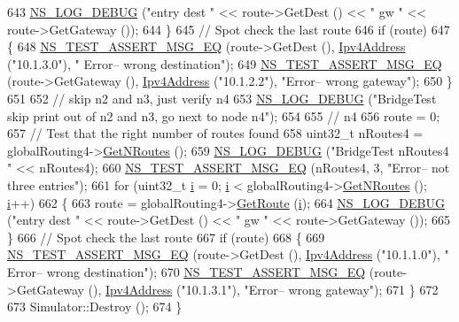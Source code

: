 \begin{DoxyCode}
643       \hyperlink{group__logging_ga413f1886406d49f59a6a0a89b77b4d0a}{NS\_LOG\_DEBUG} (\textcolor{stringliteral}{"entry dest "} << route->GetDest () << \textcolor{stringliteral}{" gw "} << route->GetGateway ());
644     \}
645   \textcolor{comment}{// Spot check the last route}
646   \textcolor{keywordflow}{if} (route)
647     \{
648       \hyperlink{group__testing_ga2a9d78cffb3db8e867c35fff0b698cf5}{NS\_TEST\_ASSERT\_MSG\_EQ} (route->GetDest (), \hyperlink{classns3_1_1Ipv4Address}{Ipv4Address} (\textcolor{stringliteral}{"10.1.3.0"}), \textcolor{stringliteral}{"
      Error-- wrong destination"});
649       \hyperlink{group__testing_ga2a9d78cffb3db8e867c35fff0b698cf5}{NS\_TEST\_ASSERT\_MSG\_EQ} (route->GetGateway (), 
      \hyperlink{classns3_1_1Ipv4Address}{Ipv4Address} (\textcolor{stringliteral}{"10.1.2.2"}), \textcolor{stringliteral}{"Error-- wrong gateway"});
650     \}
651 
652   \textcolor{comment}{// skip n2 and n3, just verify n4}
653   \hyperlink{group__logging_ga413f1886406d49f59a6a0a89b77b4d0a}{NS\_LOG\_DEBUG} (\textcolor{stringliteral}{"BridgeTest skip print out of n2 and n3, go next to node n4"});
654 
655   \textcolor{comment}{// n4}
656   route = 0;
657   \textcolor{comment}{// Test that the right number of routes found}
658   uint32\_t nRoutes4 = globalRouting4->\hyperlink{classns3_1_1Ipv4GlobalRouting_abb9d2b3642272b9bd2697a5699922fa7}{GetNRoutes} ();
659   \hyperlink{group__logging_ga413f1886406d49f59a6a0a89b77b4d0a}{NS\_LOG\_DEBUG} (\textcolor{stringliteral}{"BridgeTest nRoutes4 "} << nRoutes4);
660   \hyperlink{group__testing_ga2a9d78cffb3db8e867c35fff0b698cf5}{NS\_TEST\_ASSERT\_MSG\_EQ} (nRoutes4, 3, \textcolor{stringliteral}{"Error-- not three entries"});
661   \textcolor{keywordflow}{for} (uint32\_t \hyperlink{bernuolliDistribution_8m_a6f6ccfcf58b31cb6412107d9d5281426}{i} = 0; \hyperlink{bernuolliDistribution_8m_a6f6ccfcf58b31cb6412107d9d5281426}{i} < globalRouting4->\hyperlink{classns3_1_1Ipv4GlobalRouting_abb9d2b3642272b9bd2697a5699922fa7}{GetNRoutes} (); \hyperlink{bernuolliDistribution_8m_a6f6ccfcf58b31cb6412107d9d5281426}{i}++)
662     \{
663       route = globalRouting4->\hyperlink{classns3_1_1Ipv4GlobalRouting_accd518b9888908dbea189c1d1c73dcf1}{GetRoute} (\hyperlink{bernuolliDistribution_8m_a6f6ccfcf58b31cb6412107d9d5281426}{i});
664       \hyperlink{group__logging_ga413f1886406d49f59a6a0a89b77b4d0a}{NS\_LOG\_DEBUG} (\textcolor{stringliteral}{"entry dest "} << route->GetDest () << \textcolor{stringliteral}{" gw "} << route->GetGateway ());
665     \}
666   \textcolor{comment}{// Spot check the last route}
667   \textcolor{keywordflow}{if} (route)
668     \{
669       \hyperlink{group__testing_ga2a9d78cffb3db8e867c35fff0b698cf5}{NS\_TEST\_ASSERT\_MSG\_EQ} (route->GetDest (), \hyperlink{classns3_1_1Ipv4Address}{Ipv4Address} (\textcolor{stringliteral}{"10.1.1.0"}), \textcolor{stringliteral}{"
      Error-- wrong destination"});
670       \hyperlink{group__testing_ga2a9d78cffb3db8e867c35fff0b698cf5}{NS\_TEST\_ASSERT\_MSG\_EQ} (route->GetGateway (), 
      \hyperlink{classns3_1_1Ipv4Address}{Ipv4Address} (\textcolor{stringliteral}{"10.1.3.1"}), \textcolor{stringliteral}{"Error-- wrong gateway"});
671     \}
672 
673   Simulator::Destroy ();
674 \}
\end{DoxyCode}


